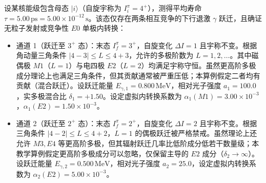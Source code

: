 设某核能级包含母态 $|i\rangle$（自旋宇称为 $I_i^\pi = 4^+$），测得平均寿命 $\tau = 5.00\,\text{ps} = 5.00 \times 10^{-12}\,\text{s}$。该态仅存在两条相互竞争的下行退激 $\gamma$ 跃迁，且确证无粒子发射或竞争性 $E0$ 单极内转换：
\begin{itemize}
\item 通道 1（跃迁至 $3^+$ 态）：末态 $I_f^\pi = 3^+$，自旋变化 $\Delta I = 1$ 且宇称不变。根据角动量三角条件 $|4 - 3| \le L \le 4 + 3$，允许的多极阶数为 $L = 1, 2, \dots$。其中磁偶极 $M1$（$L=1$）与电四极 $E2$（$L=2$）均满足宇称守恒。虽然更高阶多极成分理论上也满足三角条件，但其贡献通常被严重压低；本算例假定二者均有贡献（混合跃迁）。设跃迁能量 $E_{\gamma, 1} = 0.800\,\text{MeV}$，相对光子强度 $a_1 = 100.0$，实多极混合比 $\delta_1 = +1.50$。设定虚拟内转换系数为 $\alpha_1(M1) = 3.00 \times 10^{-3}$，$\alpha_1(E2) = 1.50 \times 10^{-3}$。
\item 通道 2（跃迁至 $2^+$ 态）：末态 $I_f^\pi = 2^+$，自旋变化 $\Delta I = 2$ 且宇称不变。根据三角条件 $|4 - 2| \le L \le 4 + 2$，$L = 1$ 的偶极跃迁被严格禁戒。虽然理论上还允许 $M3, E4$ 等更高阶多极，但其辐射跃迁几率比低阶成分低若干数量级；本教学算例假定更高阶多极成分可以忽略，仅保留主导的 $E2$ 成分（$\delta_2 \to \infty$）。设跃迁能量 $E_{\gamma, 2} = 0.500\,\text{MeV}$，相对光子强度 $a_2 = 25.0$，设定虚拟内转换系数为 $\alpha_2(E2) = 5.00 \times 10^{-3}$。
\end{itemize}

